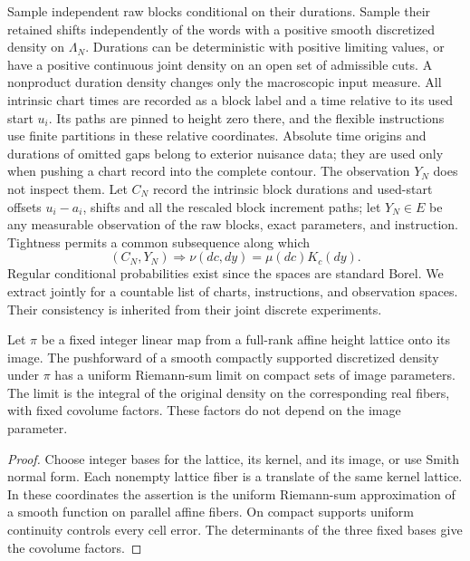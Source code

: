 Sample independent raw blocks conditional on their durations.  Sample
their retained shifts independently of the words with a positive smooth
discretized density on $\Lambda_N$.  Durations can be deterministic with
positive limiting values, or have a positive continuous joint density on
an open set of admissible cuts.  A nonproduct duration density changes only
the macroscopic input measure.  All intrinsic chart times are recorded
as a block label and a time relative to its used start $u_i$.  Its paths
are pinned to height zero there, and the flexible instructions
use finite partitions in these relative coordinates.  Absolute time
origins and durations of omitted gaps belong to exterior nuisance data;
they are used only when pushing a chart record into the complete contour.
The observation $Y_N$ does not inspect them.  Let $C_N$ record the
intrinsic block durations and used-start offsets $u_i-a_i$,
shifts and all the rescaled block increment paths; let
$Y_N\in E$ be any measurable observation of the raw blocks, exact
parameters, and instruction.  Tightness permits a common subsequence
along which
\begin{equation}\label{loc:reference-law}
 (C_N,Y_N)\Longrightarrow \nu(dc,dy)=\mu(dc)K_c(dy).
\end{equation}
Regular conditional probabilities exist since the spaces are standard
Borel.  We extract jointly for a countable list of charts, instructions,
and observation spaces.  Their consistency is inherited from their joint
discrete experiments.

\begin{lemma}\label{loc:projection-density}
Let $\pi$ be a fixed integer linear map from a full-rank affine height
lattice onto its image.  The pushforward of a smooth compactly supported
discretized density under $\pi$ has a uniform Riemann-sum limit on
compact sets of image parameters.  The limit is the integral of the
original density on the corresponding real fibers, with fixed covolume
factors.  These factors do not depend on the image parameter.
\end{lemma}
\begin{proof}
Choose integer bases for the lattice, its kernel, and its image, or use
Smith normal form.  Each nonempty lattice fiber is a translate of the
same kernel lattice.  In these coordinates the assertion is the uniform
Riemann-sum approximation of a smooth function on parallel affine fibers.
On compact supports uniform continuity controls every cell error.  The
determinants of the three fixed bases give the covolume factors.
\end{proof}

